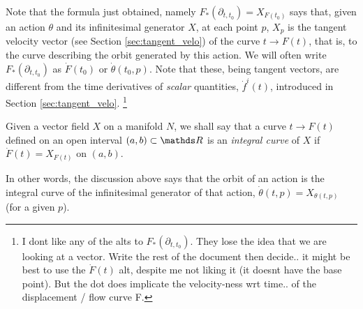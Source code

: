 Note that the formula just obtained, namely $F_*(\partial_{t,t_0}) = X_{F(t_0)}$ says that, given an action $\theta$ and its infinitesimal generator $X$, at each point $p$, $X_p$ is the tangent velocity vector (see Section \ref{sec:tangent_velo}) of the curve $t\rightarrow F(t)$, that is, to the curve describing the orbit generated by this action. {\color{red}We will often write $F_*(\partial_{t,t_0})$ as $\dot F(t_0)$ or $\dot \theta(t_0, p)$. Note that these, being tangent vectors, are different from the time derivatives of \textit{scalar} quantities, $\dot f^i(t)$, introduced in Section \ref{sec:tangent_velo}. }\footnote{I dont like any of the alts to $F_*(\partial_{t,t_0})$. They lose the idea that we are looking at a vector. Write the rest of the document then decide.. it might be best to use the $\dot F(t)$ alt, despite me not liking it (it doesnt have the base point). But the dot does implicate the velocity-ness wrt time.. of the displacement / flow curve F. }


\begin{defn}
Given a vector field $X$ on a manifold $N$, we shall say that a curve $t\rightarrow F(t)$ defined on an open interval $(a,b)\subset \R$ is an \textit{integral curve} of $X$ if $\dot F(t) = X_{F(t)}$ on $(a, b)$.
\end{defn}
In other words, the discussion above says that the orbit of an action is the integral curve of the infinitesimal generator of that action, $\dot \theta(t,p) = X_{\theta(t,p)}$ (for a given $p$). 



